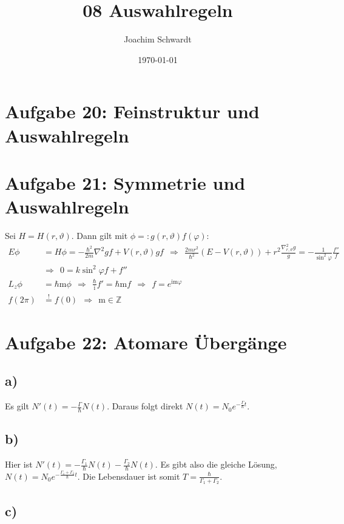 \documentclass[a4paper,12pt]{article}
\newcommand{\tecxt}{}
\begin{document}
\title{08 Auswahlregeln}
\author{Joachim Schwardt}
\date{\today}
\maketitle

\section*{Aufgabe 20: Feinstruktur und Auswahlregeln}
\section*{Aufgabe 21: Symmetrie und Auswahlregeln}
Sei $H=H(r,\vartheta)$. Dann gilt mit $\phi=:g(r,\vartheta)f(\varphi)$:
\begin{align*}
E\phi&=H\phi=-\frac{\hbar^2}{2m}\nabla^2gf +V(r,\vartheta)gf\ \ \Rightarrow\ \ \frac{2mr^2}{\hbar^2}(E-V(r,\vartheta))+r^2\frac{\nabla_{r,\vartheta}^2g}{g}=-\frac{1}{\sin^2\varphi}\frac{f''}{f}\\
&\Rightarrow\ \ 0=k\sin^2\varphi f+f''\\
L_z\phi&=\hbar \tecxt\text{m}\phi\ \ \Rightarrow\ \ \frac{\hbar}{\tecxt\text{i}}f'=\hbar \tecxt\text{m} f\ \ \Rightarrow\ \ f=e^{\tecxt\text{im}\varphi}\\
f(2\pi)&\overset{!}{=}f(0)\ \ \Rightarrow\ \ \tecxt\text{m}\in\mathbb{Z}
\end{align*}
\section*{Aufgabe 22: Atomare Übergänge}
\subsection*{a)}
Es gilt $N'(t)=-\frac{\Gamma}{\hbar}N(t)$. Daraus folgt direkt $N(t)=N_0e^{-\frac{\Gamma}{\hbar}t}$.
\subsection*{b)}
Hier ist $N'(t)=-\frac{\Gamma_1}{\hbar}N(t)-\frac{\Gamma_2}{\hbar}N(t)$. Es gibt also die gleiche Lösung, $N(t)=N_0e^{-\frac{\Gamma_1+\Gamma_2}{\hbar}t}$. Die Lebensdauer ist somit $T=\frac{\hbar}{\Gamma_1+\Gamma_2}$.
\subsection*{c)}





































\end{document}
